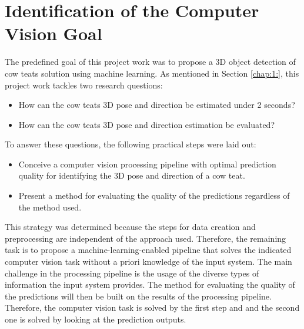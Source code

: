 \section{Identification of the Computer Vision Goal}\label{chap:3:goal}
The predefined goal of this project work was to propose a 3D object detection of cow teats solution using machine learning. As mentioned in Section \ref{chap:1:}, this project work tackles two research questions: 
\begin{itemize}
    \item How can the cow teats 3D pose and direction be estimated under 2 seconds?
    \item How can the cow teats 3D pose and direction estimation be evaluated?
\end{itemize}
To answer these questions, the following practical steps were laid out:
\begin{itemize}
    \item Conceive a computer vision processing pipeline with optimal prediction quality for identifying the 3D pose and direction of a cow teat.
    \item Present a method for evaluating the quality of the predictions regardless of the method used.
\end{itemize}
This strategy was determined because the steps for data creation and preprocessing are independent of the approach used. Therefore, the remaining task is to propose a machine-learning-enabled pipeline that solves the indicated computer vision task without a priori knowledge of the input system. The main challenge in the processing pipeline is the usage of the diverse types of information the input system provides. The method for evaluating the quality of the predictions will then be built on the results of the processing pipeline. Therefore, the computer vision task is solved by the first step and and the second one is solved by looking at the prediction outputs.

